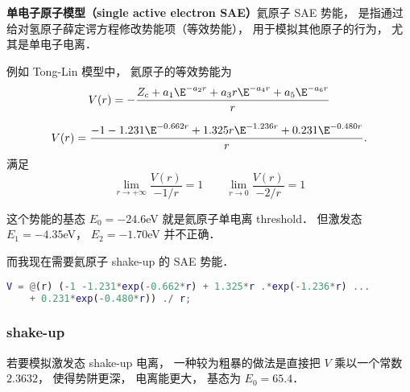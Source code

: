 
\textbf{单电子原子模型（single active electron SAE）}氦原子 SAE 势能， 是指通过给对氢原子薛定谔方程修改势能项（等效势能）， 用于模拟其他原子的行为， 尤其是单电子电离．

例如 Tong-Lin 模型中， 氦原子的等效势能为
\begin{equation}
V(r) = -\frac{Z_c + a_1 \E^{-a_2 r} + a_3 r \E^{-a_4 r} + a_5 \E^{-a_6 r}}{r}
\end{equation}

\begin{equation}
V(r) = \frac{-1 -1.231\E^{-0.662r} + 1.325r \E^{-1.236r} + 0.231\E^{-0.480r}}{r}.
\end{equation}
满足
\begin{equation}
\lim_{r\to +\infty} \frac{V(r)}{-1/r} = 1
\qquad
\lim_{r\to 0} \frac{V(r)}{-2/r} = 1
\end{equation}

这个势能的基态 $E_0 = -24.6$eV 就是氦原子单电离 threshold． 但激发态 $E_1 = -4.35$eV， $E_2 = -1.70$eV 并不正确．

而我现在需要氦原子 shake-up 的 SAE 势能．

\begin{lstlisting}[language=matlab]
V = @(r) (-1 -1.231*exp(-0.662*r) + 1.325*r .*exp(-1.236*r) ...
    + 0.231*exp(-0.480*r)) ./ r;
\end{lstlisting}

\subsubsection{shake-up}
若要模拟激发态 shake-up 电离， 一种较为粗暴的做法是直接把 $V$ 乘以一个常数 $2.3632$， 使得势阱更深， 电离能更大， 基态为 $E_0 = 65.4$．
